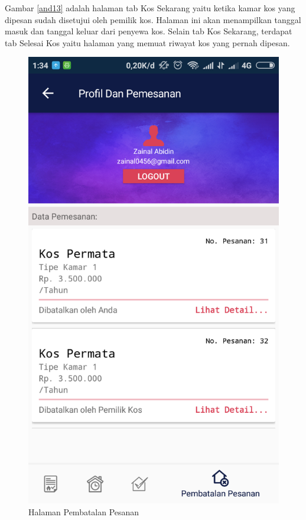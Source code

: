 		Gambar \ref{and13} adalah halaman tab Kos Sekarang yaitu ketika kamar kos yang dipesan sudah disetujui oleh pemilik kos. Halaman ini akan menampilkan tanggal masuk dan tanggal keluar dari penyewa kos. Selain tab Kos Sekarang, terdapat tab Selesai Kos yaitu halaman yang memuat riwayat kos yang pernah dipesan.
		
		\begin{figure}[H]
			\centering
			\includegraphics[scale=0.25]{gambar/and/17}
			\caption{Halaman Pembatalan Pesanan}
			\label{and14}
		\end{figure}
	
